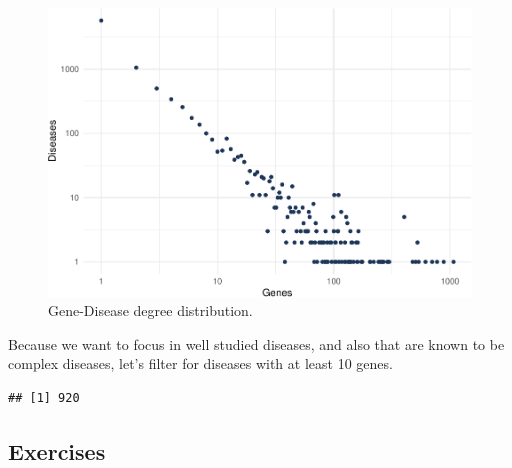 \documentclass[
]{book}
\newenvironment{Shaded}{\begin{snugshade}}{\end{snugshade}}
\newcommand{\AttributeTok}[1]{\textcolor[rgb]{0.77,0.63,0.00}{#1}}
\newcommand{\DecValTok}[1]{\textcolor[rgb]{0.00,0.00,0.81}{#1}}
\newcommand{\FunctionTok}[1]{\textcolor[rgb]{0.00,0.00,0.00}{#1}}
\newcommand{\NormalTok}[1]{#1}
\newcommand{\SpecialCharTok}[1]{\textcolor[rgb]{0.00,0.00,0.00}{#1}}
\begin{document}
\begin{figure}
\centering
\includegraphics{NetMed_files/figure-latex/unnamed-chunk-11-1.pdf}
\caption{\label{fig:unnamed-chunk-11}Gene-Disease degree distribution.}
\end{figure}

Because we want to focus in well studied diseases, and also that are known to be complex diseases, let's filter for diseases with at least 10 genes.

\begin{Shaded}
\end{Shaded}

\begin{verbatim}
## [1] 920
\end{verbatim}

\hypertarget{exercises-1}{%
\subsection{Exercises}\label{exercises-1}}
\end{document}
